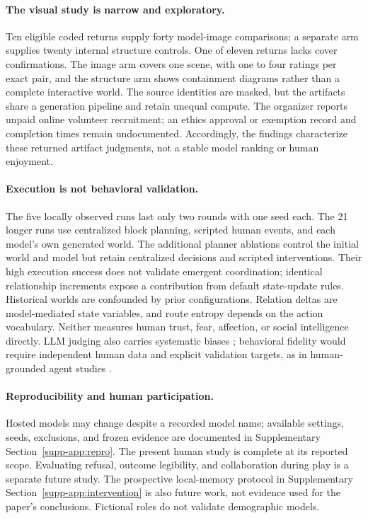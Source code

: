 \paragraph{The visual study is narrow and exploratory.}
Ten eligible coded returns supply forty model-image comparisons; a separate
arm supplies twenty internal structure controls. One of eleven returns lacks
cover confirmations. The image arm covers
one scene, with one to four ratings per exact pair, and the structure arm
shows containment diagrams rather than a complete interactive world. The
source identities are masked, but the artifacts share a generation pipeline
and retain unequal compute. The organizer reports unpaid online volunteer recruitment; an
ethics approval or exemption record and completion times remain undocumented. Accordingly, the findings characterize these
returned artifact judgments, not a stable model ranking or human enjoyment.

\paragraph{Execution is not behavioral validation.}
The five locally observed runs last only two rounds with one seed each. The
21 longer runs use centralized block planning, scripted human events, and each
model's own generated world. The additional planner ablations control the
initial world and model but retain centralized decisions and scripted
interventions. Their high execution success does not validate
emergent coordination; identical relationship increments expose a contribution
from default state-update rules. Historical worlds
are confounded by prior configurations. Relation deltas are model-mediated
state variables, and route entropy depends on the action vocabulary.
Neither measures human trust, fear, affection, or social intelligence directly.
LLM judging also carries systematic biases \cite{judge}; behavioral fidelity
would require independent human data and explicit validation targets, as in
human-grounded agent studies \cite{park1000}.

\paragraph{Reproducibility and human participation.}
Hosted models may change despite a recorded model name; available settings,
seeds, exclusions, and frozen evidence are documented in Supplementary Section~\ref{supp-app:repro}.
The present human study is complete at its reported scope. Evaluating refusal,
outcome legibility, and collaboration during play is a separate future study.
The prospective local-memory protocol in Supplementary Section~\ref{supp-app:intervention}
is also future work, not evidence used for the paper's conclusions. Fictional
roles do not validate demographic models.

